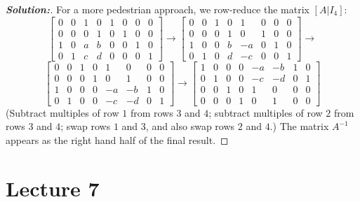 \documentclass[a4paper]{amsart}
\theoremstyle{definition}
\newenvironment{solution}{\begin{proof}[\textbf{Solution:}] \vphantom{u}}{\end{proof}}
\begin{document}
\begin{solution}
 For a more pedestrian approach, we row-reduce the matrix $[A|I_4]$:
 \[ \left[\begin{array}{cccc|cccc}
     0&0&1&0 & 1&0&0&0 \\
     0&0&0&1 & 0&1&0&0 \\
     1&0&a&b & 0&0&1&0 \\
     0&1&c&d & 0&0&0&1
    \end{array}\right]
    \to 
    \left[\begin{array}{cccc|cccc}
     0&0&1&0 &  1&0&0&0 \\
     0&0&0&1 &  0&1&0&0 \\
     1&0&0&b & -a&0&1&0 \\
     0&1&0&d & -c&0&0&1
    \end{array}\right]
    \to 
 \] \[
    \left[\begin{array}{cccc|cccc}
     0&0&1&0 &  1& 0&0&0 \\
     0&0&0&1 &  0& 1&0&0 \\
     1&0&0&0 & -a&-b&1&0 \\
     0&1&0&0 & -c&-d&0&1
    \end{array}\right]
    \to 
    \left[\begin{array}{cccc|cccc}
     1&0&0&0 & -a&-b&1&0 \\
     0&1&0&0 & -c&-d&0&1 \\
     0&0&1&0 &  1& 0&0&0 \\
     0&0&0&1 &  0& 1&0&0 
    \end{array}\right]    
 \]
 (Subtract multiples of row $1$ from rows $3$ and $4$; subtract
 multiples of row $2$ from rows $3$ and $4$; swap rows $1$ and $3$,
 and also swap rows $2$ and $4$.)  The matrix $A^{-1}$ appears as the
 right hand half of the final result.
\end{solution}

\section{Lecture 7}
\end{document}
